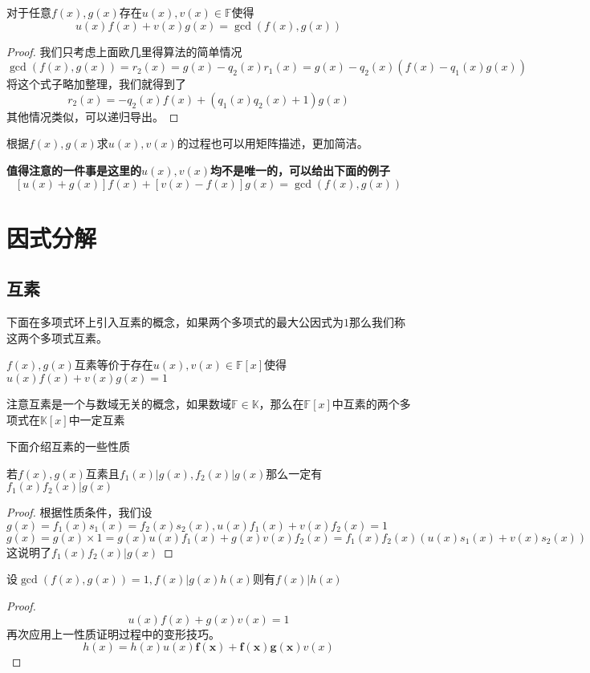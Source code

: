 \documentclass{ctexart}
\begin{document}
\begin{theorem}
    对于任意$f(x),g(x)$存在$u(x),v(x) \in \mathbb{F}$使得$$u(x)f(x) + v(x)g(x) = \gcd(f(x),g(x))$$
\end{theorem}

\begin{proof}
    我们只考虑上面欧几里得算法的简单情况
    $$\gcd(f(x),g(x)) = r_2(x) = g(x) - q_2(x)r_1(x) = g(x) - q_2(x)(f(x) - q_1(x)g(x))$$
    将这个式子略加整理，我们就得到了
    $$r_2(x) = -q_2(x)f(x)+ (q_1(x)q_2(x) + 1) g(x)$$
    其他情况类似，可以递归导出。
\end{proof}

根据$f(x),g(x)$求$u(x),v(x)$的过程也可以用矩阵描述，更加简洁。

\textbf{值得注意的一件事是这里的$u(x),v(x)$均不是唯一的，可以给出下面的例子}
$$[u(x) + g(x)]f(x) + [v(x) - f(x)]g(x) = \gcd(f(x),g(x))$$

\section{因式分解}
\subsection{互素}
下面在多项式环上引入互素的概念，如果两个多项式的最大公因式为$1$那么我们称这两个多项式互素。

\begin{theorem}
    $f(x),g(x)$互素等价于存在$u(x),v(x) \in \mathbb{F}[x]$使得$u(x)f(x) + v(x)g(x) = 1$
\end{theorem}

注意互素是一个与数域无关的概念，如果数域$\mathbb F \in \mathbb K$，那么在$\mathbb F[x]$中互素的两个多项式在$\mathbb K[x]$中一定互素

下面介绍互素的一些性质
\begin{proposition}
    若$f(x),g(x)$互素且$f_1(x) | g(x),f_2(x)|g(x)$那么一定有$f_1(x)f_2(x)|g(x)$    
\end{proposition}
\begin{proof}
    根据性质条件，我们设$g(x) = f_1(x)s_1(x) = f_2(x)s_2(x), u(x)f_1(x) + v(x)f_2(x) = 1$
    $$g(x) = g(x) \times 1 = g(x)u(x)f_1(x) + g(x)v(x)f_2(x) = f_1(x)f_2(x) (u(x)s_1(x) + v(x)s_2(x))$$
    这说明了$f_1(x)f_2(x) | g(x)$ 
    \qedhere
\end{proof}

\begin{proposition}
    设$\gcd(f(x),g(x)) = 1,f(x) | g(x)h(x)$则有$f(x) | h(x)$    
\end{proposition}
\begin{proof}
    $$u(x)f(x) + g(x)v(x) = 1$$
    再次应用上一性质证明过程中的变形技巧。
    $$h(x) = h(x)u(x)\mathbf{f(x)} + \mathbf{f(x)g(x)}v(x)$$
    \qedhere
\end{proof}
\end{document}
